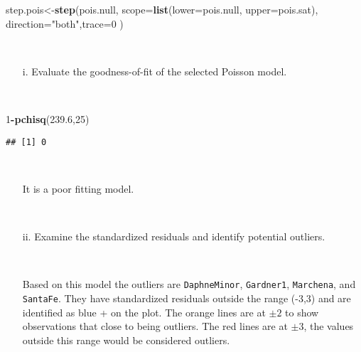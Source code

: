 \documentclass[]{article}
\newenvironment{Shaded}{\begin{snugshade}}{\end{snugshade}}
\newcommand{\KeywordTok}[1]{\textcolor[rgb]{0.13,0.29,0.53}{\textbf{#1}}}
\newcommand{\DataTypeTok}[1]{\textcolor[rgb]{0.13,0.29,0.53}{#1}}
\newcommand{\DecValTok}[1]{\textcolor[rgb]{0.00,0.00,0.81}{#1}}
\newcommand{\FloatTok}[1]{\textcolor[rgb]{0.00,0.00,0.81}{#1}}
\newcommand{\StringTok}[1]{\textcolor[rgb]{0.31,0.60,0.02}{#1}}
\newcommand{\OperatorTok}[1]{\textcolor[rgb]{0.81,0.36,0.00}{\textbf{#1}}}
\newcommand{\NormalTok}[1]{#1}
\begin{document}
\begin{Shaded}
\begin{Highlighting}[]
\NormalTok{step.pois<-}\KeywordTok{step}\NormalTok{(pois.null, }\DataTypeTok{scope=}\KeywordTok{list}\NormalTok{(}\DataTypeTok{lower=}\NormalTok{pois.null,  }\DataTypeTok{upper=}\NormalTok{pois.sat), }\DataTypeTok{direction=}\StringTok{"both"}\NormalTok{,}\DataTypeTok{trace=}\DecValTok{0}\NormalTok{  )}
\end{Highlighting}
\end{Shaded}

~

\begin{itemize} 
\item[i.] Evaluate the goodness-of-fit of the selected Poisson model.
\end{itemize}

~

\begin{Shaded}
\begin{Highlighting}[]
\DecValTok{1}\OperatorTok{-}\KeywordTok{pchisq}\NormalTok{(}\FloatTok{239.6}\NormalTok{,}\DecValTok{25}\NormalTok{)}
\end{Highlighting}
\end{Shaded}

\begin{verbatim}
## [1] 0
\end{verbatim}

~

\begin{itemize} 
\item[] It is a poor fitting model.
\end{itemize}

~

\begin{itemize} 
\item[ii.] Examine the standardized residuals and identify potential outliers.
\end{itemize}

~

\begin{itemize} 
\item[] Based on this model the outliers are {\tt DaphneMinor}, {\tt Gardner1}, {\tt Marchena}, and {\tt SantaFe}. They have standardized residuals outside the range (-3,3) and are identified as blue + on the plot. The orange lines are at $\pm 2$ to show observations that close to being outliers. The red lines are at $\pm 3$, the values outside this range would be considered outliers.
\end{itemize}
\end{document}
